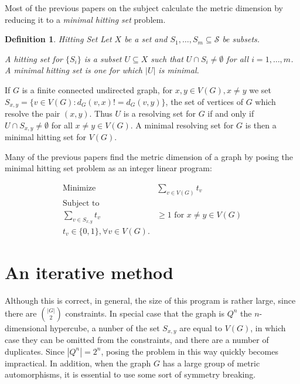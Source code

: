 \documentclass{article}
\newcommand{\cS}{\mathcal{S}}
\newtheorem{definition}{Definition}
\begin{document}
Most of the previous papers on the subject calculate the metric
dimension by reducing it to a \emph{minimal hitting set} problem.
\begin{definition}{Hitting Set}
Let $X$ be a set and $S_1 , \dots, S_m \subseteq \cS$ be subsets.

A \emph{hitting set} for $\{S_i\}$ is a subset $U \subseteq X$ such
that $U \cap S_i \ne \emptyset$ for all $i=1, \dots, m$.
A \emph{minimal hitting set} is one for which $|U|$ is minimal.
\end{definition}
If $G$ is a finite connected undirected graph, for $x,y \in V(G), x
\ne y$
we set $S_{x,y} = \{v \in V(G): d_G(v,x) != d_G(v,y)\}$, the set of
vertices of $G$ which resolve the pair $(x,y)$.  Thus $U$ is a
resolving set for $G$ if and only if $U \cap S_{x,y} \ne \emptyset$
for all $x \ne y \in V(G)$.
A minimal resolving set for $G$ is then a minimal hitting set
for $V(G)$.

Many of the previous papers find the metric dimension of a graph by
posing the minimal hitting set problem as an integer linear program:

\begin{equation}
  \label{eq:ilp}
  \begin{aligned}
    \text{Minimize } & \sum_{v \in V(G)} t_v \\
    \text{Subject to} \\
    \sum_{v \in S_{x,y}} t_v & \ge 1 \text{ for } x \ne y \in V(G) \\
    t_v \in \{0,1\}, \forall v \in V(G).
  \end{aligned}
\end{equation}

\section{An iterative method}
\label{sec:iterative}

Although this is correct, in general, the size of this program is
rather large, since there are $\binom{|G|}{2}$ constraints.  In
special case that the graph is $Q^n$ the $n$-dimensional hypercube, a
nunber of the set $S_{x,y}$ are equal to $V(G)$, in which case they
can be omitted from the constraints, and there are a number of
duplicates.  Since $|Q^n| = 2^n$, posing the problem in this way
quickly becomes impractical.  In addition, when the graph $G$ has a
large group of metric automorphisms, it is essential to use some sort
of symmetry breaking.
\end{document}
